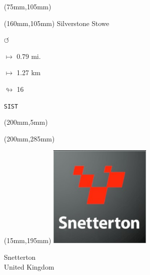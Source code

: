 \begin{textblock*}{80mm}(75mm,105mm)%
\end{textblock*}
\begin{textblock*}{40mm}(160mm,105mm)%
Silverstone Stowe
\par \Huge$\circlearrowleft$
\Large
\par$\mapsto$ 0.79 mi.
\par$\mapsto$ 1.27 km
\par$\looparrowright$ 16
\par\hfill\tiny\tt SIST\\
\end{textblock*}
\begin{textblock*}{20mm}(200mm,5mm)%
\fbox{\thepage}
\end{textblock*}
\begin{textblock*}{20mm}(200mm,285mm)%
\fbox{\thepage}
\end{textblock*}
\begin{textblock*}{50mm}(15mm,195mm)%
\includegraphics[width=50mm]{LG/2015-05-20_00095.png}
\par Snetterton\\ United Kingdom
\end{textblock*}
